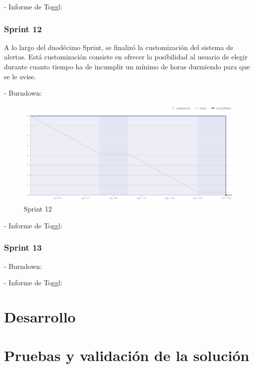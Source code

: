 \documentclass[11pt,openany]{book}
\begin{document}
- Informe de Toggl:



\subsection{Sprint 12}

A lo largo del duodécimo Sprint, se finalizó la customización del sistema de alertas. Está customización consiste en ofrecer la posibilidad al usuario de elegir durante cuanto tiempo ha de incumplir un mínimo de horas durmiendo para que se le avise.

- Burndown:

\begin{figure}[H]
\centering
\includegraphics[totalheight=7cm]{burndowns/Sprint12.png}
\caption{Sprint 12}
\end{figure}

- Informe de Toggl:



\subsection{Sprint 13}

- Burndown:

- Informe de Toggl:

\chapter{Desarrollo}


\chapter{Pruebas y validación de la solución}
\end{document}
